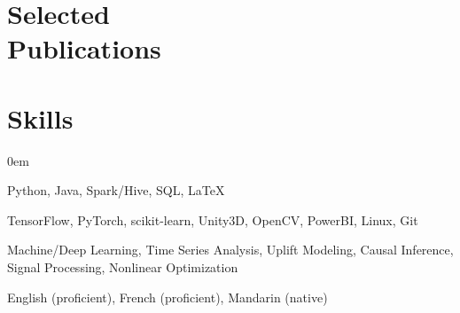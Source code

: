 \documentclass{mycv}
\begin{document}





\vspace{-\parskip}

\section{Selected \\ Publications}


\vspace{-\parskip}

\section{Skills}

\begin{description}
  \itemsep 0em
  \item[Programming:] Python, Java, Spark/Hive, SQL, \LaTeX
  \item[Frameworks \& Tools:] TensorFlow, PyTorch, scikit-learn, Unity3D, OpenCV, PowerBI, Linux, Git
  \item[Expertise:] Machine/Deep Learning, Time Series Analysis, Uplift Modeling, Causal Inference, Signal Processing, Nonlinear Optimization
  \item[Languages:] English (proficient), French (proficient), Mandarin (native)
\end{description}
\end{document}
